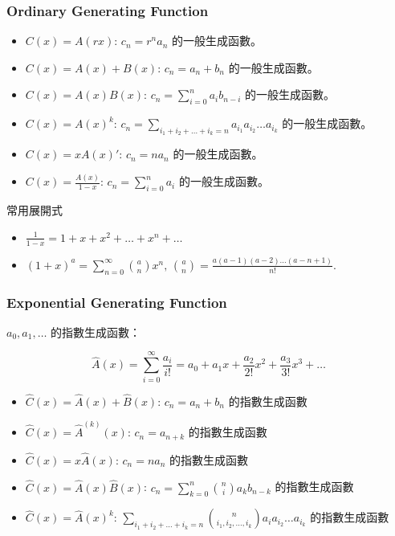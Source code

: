 \subsubsection{Ordinary Generating Function}

\begin{itemize}
    \item $C(x) = A(rx)$: $c_n = r^na_n$ 的一般生成函數。
    \item $C(x) = A(x) + B(x)$: $c_n = a_n + b_n$ 的一般生成函數。
    \item $C(x) = A(x)B(x)$: $c_n = \sum\limits_{i = 0}^n a_ib_{n - i}$ 的一般生成函數。
    \item $C(x) = A(x)^k$: $c_n = \sum\limits_{i_1 + i_2 + \ldots + i_k = n} a_{i_1}a_{i_2} \ldots a_{i_k}$ 的一般生成函數。
    \item $C(x) = xA(x)'$: $c_n = na_n$ 的一般生成函數。
    \item $C(x) = \frac{A(x)}{1 - x}$: $c_n = \sum\limits_{i = 0}^n a_i$ 的一般生成函數。
\end{itemize}

常用展開式
\begin{itemize}
    \item $\frac{1}{1 - x} = 1 + x + x^2 + \ldots + x^n + \ldots$
    \item $(1 + x)^a = \sum\limits_{n = 0}^{\infty} \binom{a}{n} x^n, \, \binom{a}{n} = \frac{a(a - 1)(a - 2) \ldots (a - n + 1)}{n!}$.
\end{itemize}

\subsubsection{Exponential Generating Function}

$a_0,a_1,\dots$ 的指數生成函數：

\[\hat A(x) = \sum_{i=0}^\infty \frac{a_i}{i!} = a_0 + a_1x + \frac{a_2}{2!}x^2 + \frac{a_3}{3!}x^3 + \dots\]

\begin{itemize}
    \item $\hat C(x) = \hat A(x) + \hat B(x)$: $c_n=a_n+b_n$ 的指數生成函數
    \item $\hat C(x) = \hat A^{(k)}(x)$: $c_n=a_{n+k}$ 的指數生成函數
    \item $\hat C(x) = x\hat A(x)$: $c_n=na_n$ 的指數生成函數
    \item $\hat C(x) = \hat A(x)\hat B(x)$: $c_n=\sum_{k=0}^n \binom{n}{i} a_kb_{n-k}$ 的指數生成函數
    \item $\hat C(x) = \hat A(x)^k$: $\sum\limits_{i_1+i_2+\dots+i_k=n} \binom{n}{i_1,i_2,\dots,i_k}a_ia_{i_2}\dots a_{i_k}$ 的指數生成函數
\end{itemize}
